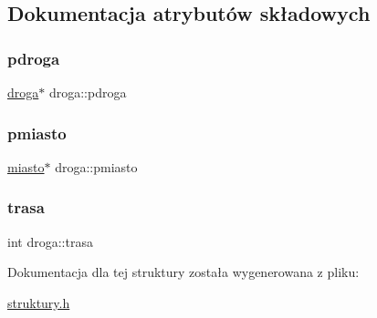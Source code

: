 \subsection{Dokumentacja atrybutów składowych}
\mbox{\label{structdroga_a7ed57ce3de3b4184ba7f7c805964626f}} 
\subsubsection{\texorpdfstring{pdroga}{pdroga}}
{\footnotesize\ttfamily \mbox{\hyperlink{structdroga}{droga}}$\ast$ droga\+::pdroga}

\mbox{\label{structdroga_a9c782b9f5281ee0f4cb4581a364b4471}} 
\subsubsection{\texorpdfstring{pmiasto}{pmiasto}}
{\footnotesize\ttfamily \mbox{\hyperlink{structmiasto}{miasto}}$\ast$ droga\+::pmiasto}

\mbox{\label{structdroga_a4788083344d3da2783792f80b35ab524}} 
\subsubsection{\texorpdfstring{trasa}{trasa}}
{\footnotesize\ttfamily int droga\+::trasa}



Dokumentacja dla tej struktury została wygenerowana z pliku\+:\begin{DoxyCompactItemize}
\item 
\mbox{\hyperlink{struktury_8h}{struktury.\+h}}\end{DoxyCompactItemize}
